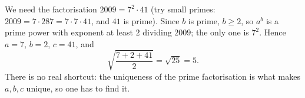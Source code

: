 We need the factorisation $2009=7^2\cdot41$ (try small primes: $2009=7\cdot287=7\cdot7\cdot41$, and $41$ is prime). Since $b$ is prime, $b\ge2$, so $a^b$ is a prime power with exponent at least $2$ dividing $2009$; the only one is $7^2$. Hence $a=7$, $b=2$, $c=41$, and
\[
\sqrt{\dfrac{7+2+41}{2}}=\sqrt{25}=\boxed{5}.
\]
There is no real shortcut: the uniqueness of the prime factorisation is what makes $a,b,c$ unique, so one has to find it.
